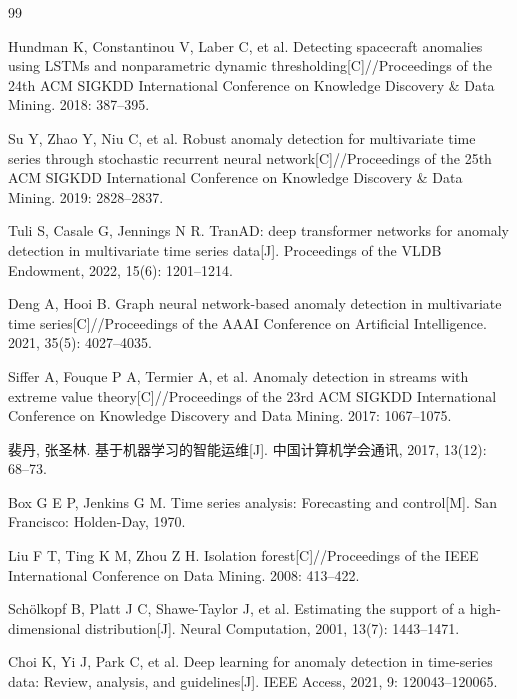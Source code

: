 \documentclass[10.5pt,a4paper,twocolumn]{ctexart}
\begin{document}
\begin{thebibliography}{99}

Hundman K, Constantinou V, Laber C, et al. Detecting spacecraft anomalies using LSTMs and nonparametric dynamic thresholding[C]//Proceedings of the 24th ACM SIGKDD International Conference on Knowledge Discovery \& Data Mining. 2018: 387--395.

Su Y, Zhao Y, Niu C, et al. Robust anomaly detection for multivariate time series through stochastic recurrent neural network[C]//Proceedings of the 25th ACM SIGKDD International Conference on Knowledge Discovery \& Data Mining. 2019: 2828--2837.

Tuli S, Casale G, Jennings N R. TranAD: deep transformer networks for anomaly detection in multivariate time series data[J]. Proceedings of the VLDB Endowment, 2022, 15(6): 1201--1214.

Deng A, Hooi B. Graph neural network-based anomaly detection in multivariate time series[C]//Proceedings of the AAAI Conference on Artificial Intelligence. 2021, 35(5): 4027--4035.

Siffer A, Fouque P A, Termier A, et al. Anomaly detection in streams with extreme value theory[C]//Proceedings of the 23rd ACM SIGKDD International Conference on Knowledge Discovery and Data Mining. 2017: 1067--1075.

裴丹, 张圣林. 基于机器学习的智能运维[J]. 中国计算机学会通讯, 2017, 13(12): 68--73.

Box G E P, Jenkins G M. Time series analysis: Forecasting and control[M]. San Francisco: Holden-Day, 1970.

Liu F T, Ting K M, Zhou Z H. Isolation forest[C]//Proceedings of the IEEE International Conference on Data Mining. 2008: 413--422.

Sch{\"o}lkopf B, Platt J C, Shawe-Taylor J, et al. Estimating the support of a high-dimensional distribution[J]. Neural Computation, 2001, 13(7): 1443--1471.

Choi K, Yi J, Park C, et al. Deep learning for anomaly detection in time-series data: Review, analysis, and guidelines[J]. IEEE Access, 2021, 9: 120043--120065.


\end{thebibliography}
\end{document}
